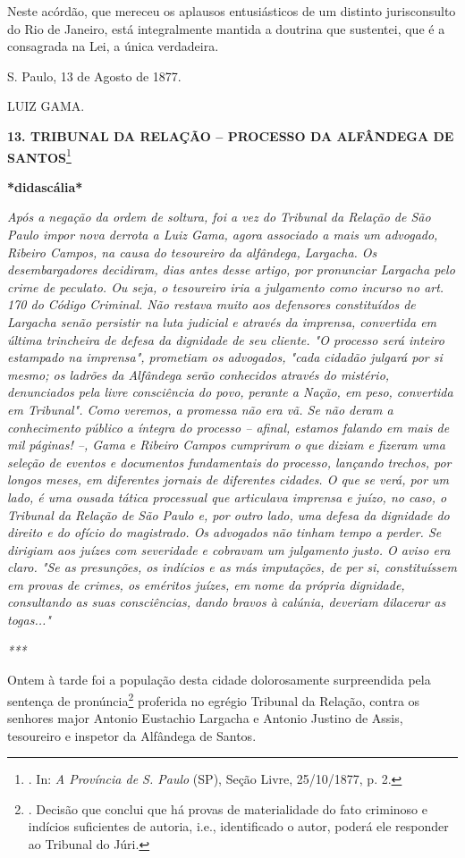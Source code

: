 \protect\hypertarget{Secao_Sem_Titulo-18}{}{}Neste acórdão, que mereceu
os aplausos entusiásticos de um distinto jurisconsulto do Rio de
Janeiro, está integralmente mantida a doutrina que sustentei, que é a
consagrada na Lei, a única verdadeira.

S. Paulo, 13 de Agosto de 1877.

LUIZ GAMA.

\textbf{13. TRIBUNAL DA RELAÇÃO -- PROCESSO DA ALFÂNDEGA DE
SANTOS}\footnote{. In: \emph{A Província de S. Paulo} (SP), Seção Livre,
  25/10/1877, p. 2.}

\textbf{*didascália*}

\emph{Após a negação da ordem de soltura, foi a vez do Tribunal da
Relação de São Paulo impor nova derrota a Luiz Gama, agora associado a
mais um advogado, Ribeiro Campos, na causa do tesoureiro da alfândega,
Largacha. Os desembargadores decidiram, dias antes desse artigo, por
pronunciar Largacha pelo crime de peculato. Ou seja, o tesoureiro iria a
julgamento como incurso no art. 170 do Código Criminal. Não restava
muito aos defensores constituídos de Largacha senão persistir na luta
judicial e através da imprensa, convertida em última trincheira de
defesa da dignidade de seu cliente. "O processo será inteiro estampado
na imprensa", prometiam os advogados, "cada cidadão julgará por si
mesmo; os ladrões da Alfândega serão conhecidos através do mistério,
denunciados pela livre consciência do povo, perante a Nação, em peso,
convertida em Tribunal". Como veremos, a promessa não era vã. Se não
deram a conhecimento público a íntegra do processo -- afinal, estamos
falando em mais de mil páginas! --, Gama e Ribeiro Campos cumpriram o
que diziam e fizeram uma seleção de eventos e documentos fundamentais do
processo, lançando trechos, por longos meses, em diferentes jornais de
diferentes cidades. O que se verá, por um lado, é uma ousada tática
processual que articulava imprensa e juízo, no caso, o Tribunal da
Relação de São Paulo e, por outro lado, uma defesa da dignidade do
direito e do ofício do magistrado. Os advogados não tinham tempo a
perder. Se dirigiam aos juízes com severidade e cobravam um julgamento
justo. O aviso era claro. "Se as presunções, os indícios e as más
imputações, de per si, constituíssem em provas de crimes, os eméritos
juízes, em nome da própria dignidade, consultando as suas consciências,
dando bravos à calúnia, deveriam dilacerar as togas..." }

\emph{***}

Ontem à tarde foi a população desta cidade dolorosamente surpreendida
pela sentença de pronúncia\footnote{. Decisão que conclui que há provas
  de materialidade do fato criminoso e indícios suficientes de autoria,
  i.e., identificado o autor, poderá ele responder ao Tribunal do Júri.}
proferida no egrégio Tribunal da Relação, contra os senhores major
Antonio Eustachio Largacha e Antonio Justino de Assis, tesoureiro e
inspetor da Alfândega de Santos.

